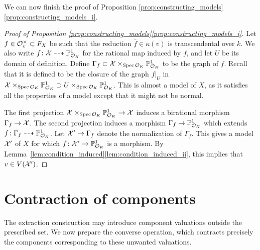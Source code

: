 We can now finish the proof of Proposition \ref{prop:constructing_models}\ref{prop:constructing_models_i}.

\begin{proof}[Proof of Proposition \ref{prop:constructing_models}\ref{prop:constructing_models_i}]
    Let $f \in \mathcal{O}_v^\times \subset F_X$ be such that the reduction $\bar{f} \in \kappa(v)$ is transcendental over $k$.
    We also write $f \colon \mathcal X \dashrightarrow \mathbb P^1_{\mathcal O_K}$ for the rational map induced by $f$, and let $U$ be its domain of definition.
    Define $\Gamma_f \subset \mathcal X \times_{\operatorname{Spec}\mathcal O_K } \mathbb P^1_{\mathcal O_K}$ to be the graph of $f$.
    Recall that it is defined to be the closure of the graph $f|_U$ in $\mathcal X \times_{\operatorname{Spec}\mathcal O_K } \mathbb P^1_{\mathcal O_K} \supset U \times_{\operatorname{Spec}\mathcal O_K } \mathbb P^1_{\mathcal O_K}$.
    This is almost a model of $X$, as it satisfies all the properties of a model except that it might not be normal.
    \begin{center}
    \end{center}
    The first projection $\mathcal X \times_{\operatorname{Spec}\mathcal O_K } \mathbb P^1_{\mathcal O_K} \to \mathcal X$ induces a birational morphism $\Gamma_f \to \mathcal X$.
    The second projection induces a morphism $\Gamma_f \to \mathbb P^1_{\mathcal O_K}$ which extends $f \colon \Gamma_f \dashrightarrow \mathbb P^1_{\mathcal O_K}$.
    Let $\mathcal X' \to \Gamma_f$ denote the normalization of $\Gamma_f$.
    This gives a model $\mathcal X'$ of $X$ for which $f \colon \mathcal X' \to \mathbb P^1_{\mathcal O_K}$ is a morphism.
    By Lemma~\ref{lem:condition_induced}\ref{lem:condition_induced_ii}, this implies that $v \in V(\mathcal X')$.
\end{proof}

\section{Contraction of components}\label{sec:contraction-of-components}
The extraction construction may introduce component valuations outside the prescribed set. We now prepare the converse operation, which contracts precisely the components corresponding to these unwanted valuations.

